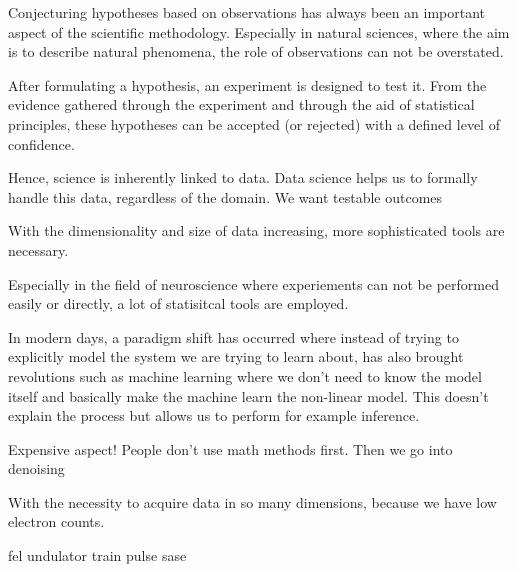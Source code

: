 Conjecturing hypotheses based on observations has always been an important aspect of the scientific methodology. Especially in natural sciences, where the aim is to describe natural phenomena, the role of observations can not be overstated. 


After formulating a hypothesis, an experiment is designed to test it. From the evidence gathered through the experiment and through the aid of statistical principles, these hypotheses can be accepted (or rejected) with a defined level of confidence.

Hence, science is inherently linked to data. Data science helps us to formally handle this data, regardless of the domain. We want testable outcomes

With the dimensionality and size of data increasing, more sophisticated tools are necessary. 

Especially in the field of neuroscience where experiements can not be performed easily or directly, a lot of statisitcal tools are employed.

In modern days, a paradigm shift has occurred where instead of trying to explicitly model the system we are trying to learn about, 
has also brought revolutions such as machine learning where we don't need to know the model itself and basically make the machine learn the non-linear model. This doesn't explain the process but allows us to perform for example inference.


Expensive aspect! People don't use math methods first.
Then we go into denoising 

With the necessity to acquire data in so many dimensions, because we have low electron counts.

\gls{fel} \gls{undulator} \gls{train} \gls{pulse} \gls{sase}